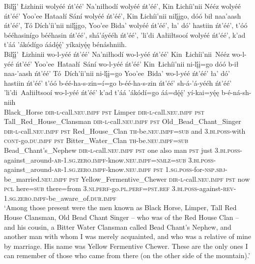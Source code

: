 \ea\label{ex:text1-23-2}
Bilį́į́’ Łizhinii wolyéé ńt’éé’ Na’niłhodí wolyéé ńt’éé’, Kin Łichíi’nii Nééz wolyéé ńt’éé’ Yoo’ee Hataałí Sání wolyéé ńt’éé’, Kin Łichíi’nii nilį́įgo, dóó bił naa’aash ńt’éé’, Tó Dích’íi’nii nilį́įgo, Yoo’ee Bida’ wolyéé ńt’éé’, ła’ dó’ hastiin ńt’éé’, t’óó bééhasinígo bééhasin ńt’éé’, shá’áyééh ńt’éé’, ’li’di Aałiiłtsooí wolyéé ńt’éé’, k’ad t’áá ’ákódígo áádę́ę́’ yíkaiyę́ę bénáshniih.\\
\gll Bilį́į́’~{Łizhinii}	wo-l-yéé	ńt’éé’	Na’niłhodí	wo-l-yéé	ńt’éé’	Kin~Łichíi’nii~{Nééz}	wo-l-yéé	ńt’éé’	Yoo’ee~Hataałí~{Sání}	wo-l-yéé	ńt’éé’	Kin~{Łichíi’nii}	ni-lį́į=go	dóó	b-ił	naa-’aash	ńt’éé’	Tó~{Dích’íi’nii}	ni-lį́į=go	Yoo’ee~{Bida’}	wo-l-yéé	ńt’éé’	ła’	dó’	hastiin	ńt’éé’	t’óó	b-éé-ha-s-zin=í=go	b-éé-ha-s-zin	ńt’éé’	sh-á-’á-yééh	ńt’éé’	’li’di~{Aałiiłtsooí}	wo-l-yéé	ńt’éé’	k’ad	t’áá	’ákódí=go	áá=dę́ę́’	yí-kai=yę́ę	b-é-ná-sh-niih\\
     Black\_Horse	\textsc{dir}-\textsc{l}-call.\textsc{neu}.\textsc{impf}	\textsc{pst}	Limper	\textsc{dir}-\textsc{l}-call.\textsc{neu}.\textsc{impf}	\textsc{pst}	Tall\_Red\_House\_Clansman	\textsc{dir}-\textsc{l}-call.\textsc{neu}.\textsc{impf}	\textsc{pst}	Old\_Bead\_Chant\_Singer	\textsc{dir}-\textsc{l}-call.\textsc{neu}.\textsc{impf}	\textsc{pst}	Red\_House\_Clan	\textsc{th}-be.\textsc{neu}.\textsc{impf}=\textsc{sub}	and	3.\textsc{bi}.\textsc{poss}-with	\textsc{cont}-go.\textsc{du}.\textsc{impf}	\textsc{pst}	Bitter\_Water\_Clan	\textsc{th}-be.\textsc{neu}.\textsc{impf}=\textsc{sub}	Bead\_Chant's\_Nephew	\textsc{dir}-\textsc{l}-call.\textsc{neu}.\textsc{impf}	\textsc{pst}	one	also	man	\textsc{pst}	just	3.\textsc{bi}.\textsc{poss}-against\_around-\textsc{ar}-1.\textsc{sg}.\textsc{zero}.\textsc{impf}-know.\textsc{neu}.\textsc{impf}=\textsc{nmlz}=\textsc{sub}	3.\textsc{bi}.\textsc{poss}-against\_around-\textsc{ar}-1.\textsc{sg}.\textsc{zero}.\textsc{impf}-know.\textsc{neu}.\textsc{impf}	\textsc{pst}	1.\textsc{sg}.\textsc{poss}-for-\textsc{nsp}.\textsc{sbj}-be\_married.\textsc{neu}.\textsc{impf}	\textsc{pst}	Yellow\_Fermentive\_Chewer	\textsc{dir}-\textsc{l}-call.\textsc{neu}.\textsc{impf}	\textsc{pst}	now	\textsc{pcl}	here=\textsc{sub}	there=from	3.\textsc{ni}.\textsc{perf}-go.\textsc{pl}.\textsc{perf}=\textsc{pst}.\textsc{ref}	3.\textsc{bi}.\textsc{poss}-against-\textsc{rev}-1.\textsc{sg}.\textsc{zero}.\textsc{impf}-be\_aware\_of.\textsc{dur}.\textsc{impf}\\
\glt `Among those present were the men known as Black Horse, Limper, Tall Red House Clansman, Old Bead Chant Singer -- who was of the Red House Clan -- and his cousin, a Bitter Water Clansman called Bead Chant's Nephew, and another man with whom I was merely acquainted, and who was a relative of mine by marriage. His name was Yellow Fermentive Chewer. These are the only ones I can remember of those who came from there (on the other side of the mountain).'
\z

